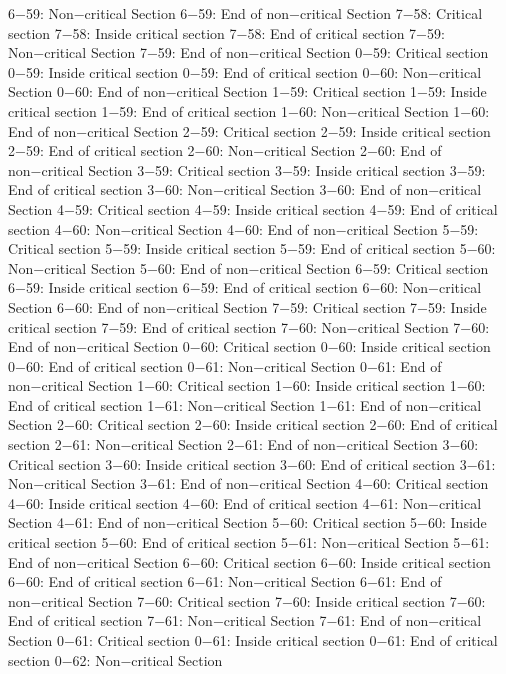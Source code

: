 6−59: Non−critical Section
6−59: End of non−critical Section
7−58: Critical section
7−58: Inside critical section
7−58: End of critical section
7−59: Non−critical Section
7−59: End of non−critical Section
0−59: Critical section
0−59: Inside critical section
0−59: End of critical section
0−60: Non−critical Section
0−60: End of non−critical Section
1−59: Critical section
1−59: Inside critical section
1−59: End of critical section
1−60: Non−critical Section
1−60: End of non−critical Section
2−59: Critical section
2−59: Inside critical section
2−59: End of critical section
2−60: Non−critical Section
2−60: End of non−critical Section
3−59: Critical section
3−59: Inside critical section
3−59: End of critical section
3−60: Non−critical Section
3−60: End of non−critical Section
4−59: Critical section
4−59: Inside critical section
4−59: End of critical section
4−60: Non−critical Section
4−60: End of non−critical Section
5−59: Critical section
5−59: Inside critical section
5−59: End of critical section
5−60: Non−critical Section
5−60: End of non−critical Section
6−59: Critical section
6−59: Inside critical section
6−59: End of critical section
6−60: Non−critical Section
6−60: End of non−critical Section
7−59: Critical section
7−59: Inside critical section
7−59: End of critical section
7−60: Non−critical Section
7−60: End of non−critical Section
0−60: Critical section
0−60: Inside critical section
0−60: End of critical section
0−61: Non−critical Section
0−61: End of non−critical Section
1−60: Critical section
1−60: Inside critical section
1−60: End of critical section
1−61: Non−critical Section
1−61: End of non−critical Section
2−60: Critical section
2−60: Inside critical section
2−60: End of critical section
2−61: Non−critical Section
2−61: End of non−critical Section
3−60: Critical section
3−60: Inside critical section
3−60: End of critical section
3−61: Non−critical Section
3−61: End of non−critical Section
4−60: Critical section
4−60: Inside critical section
4−60: End of critical section
4−61: Non−critical Section
4−61: End of non−critical Section
5−60: Critical section
5−60: Inside critical section
5−60: End of critical section
5−61: Non−critical Section
5−61: End of non−critical Section
6−60: Critical section
6−60: Inside critical section
6−60: End of critical section
6−61: Non−critical Section
6−61: End of non−critical Section
7−60: Critical section
7−60: Inside critical section
7−60: End of critical section
7−61: Non−critical Section
7−61: End of non−critical Section
0−61: Critical section
0−61: Inside critical section
0−61: End of critical section
0−62: Non−critical Section
